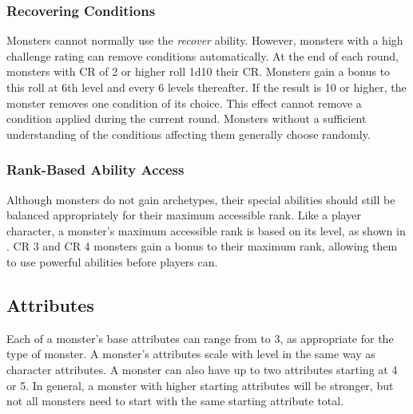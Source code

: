         \subsubsection{Recovering Conditions}
            Monsters cannot normally use the \textit{recover} ability.
            However, monsters with a high challenge rating can remove conditions automatically.
            At the end of each round, monsters with CR of 2 or higher roll 1d10 \add their CR.
            Monsters gain a  bonus to this roll at 6th level and every 6 levels thereafter.
            If the result is 10 or higher, the monster removes one condition of its choice.
            This effect cannot remove a condition applied during the current round.
            Monsters without a sufficient understanding of the conditions affecting them generally choose randomly.

        \subsubsection{Rank-Based Ability Access}
            Although monsters do not gain archetypes, their special abilities should still be balanced appropriately for their maximum accessible rank.
            Like a player character, a monster's maximum accessible rank is based on its level, as shown in .
            CR 3 and CR 4 monsters gain a  bonus to their maximum rank, allowing them to use powerful abilities before players can.

    \subsection{Attributes}
        Each of a monster's base attributes can range from  to 3, as appropriate for the type of monster.
        A monster's attributes scale with level in the same way as character attributes.
        A monster can also have up to two attributes starting at 4 or 5.
        In general, a monster with higher starting attributes will be stronger, but not all monsters need to start with the same starting attribute total.

